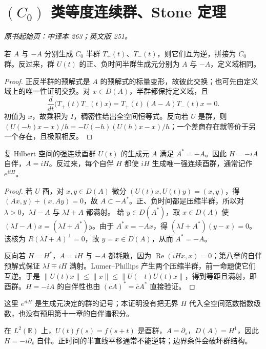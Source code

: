 \section{\texorpdfstring{$(C_0)$}{(C0)} 类等度连续群、Stone 定理}\label{sec:yosida-09-09}
\noindent\textit{原书起始页：中译本 263；英文版 251。}

\begin{proposition}[从两个方向生成群]\label{prop:y9-group-generation}
若 $A$ 与 $-A$ 分别生成 $C_0$ 半群 $T_+(t)$、$T_-(t)$，则它们互为逆，拼接为 $C_0$ 群。反过来，群 $U(t)$ 的正、负时间半群生成元分别为 $A$ 与 $-A$，定义域相同。
\end{proposition}
\begin{proof}
正反半群的预解式是 $A$ 的预解式的标量变形，故彼此交换；也可先由定义域上的唯一性证明交换。对 $x\in D(A)$，半群都保持定义域，且
\[
 \frac{d}{dt}\bigl(T_+(t)T_-(t)x\bigr)
 =T_+(t)(A-A)T_-(t)x=0.
\]
初值为 $x$，故乘积为 $I$，稠密性给出全空间恒等式。反向若 $U$ 是群，则
$(U(-h)x-x)/h=-U(-h)(U(h)x-x)/h$；一个差商存在就等价于另一个存在，且极限相反。
\end{proof}

\begin{theorem}\label{thm:y9-stone}
复 Hilbert 空间的强连续酉群 $U(t)$ 的生成元 $A$ 满足 $A^*=-A$。因此 $H=-iA$ 自伴，$A=iH$。反过来，每个自伴 $H$ 都使 $iH$ 生成唯一强连续酉群，通常记作 $e^{itH}$。
\end{theorem}
\begin{proof}
若 $U$ 酉，对 $x,y\in D(A)$ 微分 $(U(t)x,U(t)y)=(x,y)$，得 $(Ax,y)+(x,Ay)=0$，故 $A\subset-A^*$。正、负时间都是压缩半群，所以对 $\lambda>0$，$\lambda I-A$ 与 $\lambda I+A$ 都满射。
给 $y\in D(A^*)$，取 $x\in D(A)$ 使 $(\lambda I-A)x=(\lambda I+A^*)y$。由于 $A^*x=-Ax$，得 $(\lambda I+A^*)(y-x)=0$。该核为 $R(\lambda I+A)^\perp=0$，故 $y=x\in D(A)$，从而 $A^*=-A$。

\par{}
反向若 $H=H^*$，$A=iH$ 与 $-A$ 都耗散，因为 $\operatorname{Re}(iHx,x)=0$；第八章的自伴预解式保证 $\lambda I\mp iH$ 满射。Lumer--Phillips 产生两个压缩半群，前一命题使它们互逆。于是 $\|U(t)x\|\le\|x\|\le\|U(-t)U(t)x\|$，得到等距且满射，即酉群。$H=-iA$ 的自伴性也由 $(cA)^*=\overline c A^*$ 直接验证。
\end{proof}

这里 $e^{itH}$ 是生成元决定的群的记号；本证明没有把无界 $H$ 代入全空间范数指数级数，也没有预用第十一章的自伴谱积分。

\begin{example}[平移群的动量算子]
在 $L^2(\mathbb R)$ 上，$U(t)f(s)=f(s+t)$ 是酉群，$A=\partial_s$，$D(A)=H^1$，因此 $H=-i\partial_s$ 自伴。正时间的半直线平移通常不能逆转；边界条件会破坏群结构。
\end{example}

